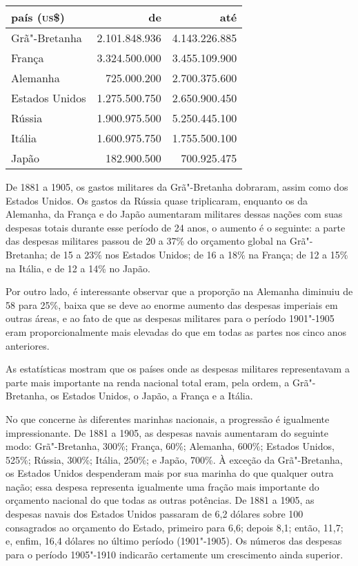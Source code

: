 \begin{center}
\begin{tabular}{lrr}
 país (\textsc{us}\$)	& de 		& até	 		\\\hline
 Grã"-Bretanha & 2.101.848.936 & 4.143.226.885 	\\
 França 	& 3.324.500.000 & 3.455.109.900 	\\
 Alemanha 	& 725.000.200 	& 2.700.375.600		\\
 Estados Unidos & 1.275.500.750 & 2.650.900.450		\\
 Rússia 	& 1.900.975.500 & 5.250.445.100		\\
 Itália 	& 1.600.975.750 & 1.755.500.100		\\
 Japão 		& 182.900.500 	& 700.925.475 
\end{tabular}
\end{center}

De 1881 a 1905, os gastos militares da Grã"-Bretanha dobraram, assim
como dos Estados Unidos. Os gastos da Rússia quase triplicaram,
enquanto os da Alemanha, da França e do Japão aumentaram
militares dessas nações com suas despesas totais durante esse período
de 24 anos, o aumento é o seguinte: a parte das despesas
militares passou de 20 a 37\% do orçamento global na Grã"-Bretanha; de
15 a 23\% nos Estados Unidos; de 16 a 18\% na França; de 12 
a 15\% na Itália, e de 12 a 14\% no Japão.

Por outro lado, é interessante observar que a proporção na Alemanha
diminuiu de 58 para 25\%, baixa que se deve ao enorme aumento das
despesas imperiais em outras áreas, e ao fato de que as despesas
militares para o período 1901"-1905 eram proporcionalmente mais
elevadas do que em todas as partes nos cinco anos anteriores.

As estatísticas mostram que os países onde as despesas militares
representavam a parte mais importante na renda nacional total eram,
pela ordem, a Grã"-Bretanha, os Estados Unidos, o Japão, a França e a
Itália.

No que concerne às diferentes marinhas nacionais, a progressão é
igualmente impressionante. De 1881 a 1905, as despesas navais
aumentaram do seguinte modo: Grã"-Bretanha, 300\%; França, 60\%;
Alemanha, 600\%; Estados Unidos, 525\%; Rússia, 300\%; Itália, 250\%; e
Japão, 700\%. À exceção da Grã"-Bretanha, os Estados Unidos
despenderam mais por sua marinha do que qualquer outra nação; essa
despesa representa igualmente uma fração mais importante do orçamento
nacional do que todas as outras potências. De 1881 a 1905, as despesas
navais dos Estados Unidos passaram de 6,2 dólares sobre 100 consagrados
ao orçamento do Estado, primeiro para 6,6; depois 8,1; então, 11,7; e, enfim, 16,4 dólares
no último período (1901"-1905). Os números das despesas para o
período 1905"-1910 indicarão certamente um crescimento ainda superior.

